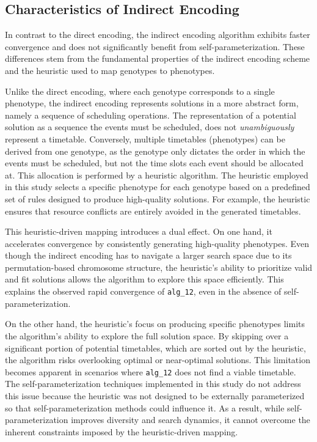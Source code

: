 \documentclass[english,examples]{isasthesis}
\begin{document}
\subsection{Characteristics of Indirect Encoding}
In contrast to the direct encoding, the indirect encoding algorithm exhibits
faster convergence and does not significantly benefit from
self-parameterization. These differences stem from the fundamental properties
of the indirect encoding scheme and the heuristic used to map genotypes
to phenotypes.

Unlike the direct encoding, where each genotype corresponds to a single
phenotype, the indirect encoding represents solutions in a more abstract form,
namely a sequence of scheduling operations.
The representation of a potential solution as a sequence the events must be
scheduled, does not \textit{unambiguously} represent a timetable.
Conversely, multiple timetables (phenotypes) can be derived from one genotype,
as the genotype only dictates the order in which the events must be scheduled,
but not the time slots each event should be allocated at.
This allocation is performed by a heuristic algorithm. The heuristic employed
in this study selects a specific phenotype for each genotype based on a
predefined set of rules designed to produce high-quality solutions.
For example, the heuristic ensures that resource conflicts are entirely avoided
in the generated timetables.

This heuristic-driven mapping introduces a dual effect. On one hand, it
accelerates convergence by consistently generating high-quality phenotypes.
Even though the indirect encoding has to navigate a larger search space due
to its permutation-based chromosome structure, the heuristic's ability to
prioritize valid and fit solutions allows the algorithm to explore this space
efficiently. This explains the observed rapid convergence of \texttt{alg\_12},
even in the absence of self-parameterization.

On the other hand, the heuristic's focus on producing specific phenotypes limits
the algorithm's ability to explore the full solution space. By skipping over
a significant portion of potential timetables, which are sorted out by the
heuristic, the algorithm risks overlooking optimal or near-optimal solutions.
This limitation becomes apparent in scenarios where \texttt{alg\_12} does not
find a viable timetable.
The self-parameterization techniques implemented in this study do not address
this issue because the heuristic was not designed to be externally
parameterized so that self-parameterization methods could influence it.
As a result, while self-parameterization improves diversity and search dynamics,
it cannot overcome the inherent constraints imposed by the heuristic-driven
mapping.
\end{document}
